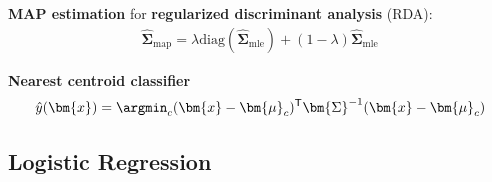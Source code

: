 \textbf{MAP estimation} for \textbf{regularized discriminant analysis} (RDA):
\begin{align}
    \hat{\bm{\Sigma}}_{\text{map}} = \lambda\mathrm{diag}(\hat{\bm{\Sigma}}_{\text{mle}}) + (1-\lambda)\hat{\bm{\Sigma}}_{\text{mle}}
\end{align}

\textbf{Nearest centroid classifier}
\begin{align}
    \hat{y}(\bm{x})=\argmin_{c}(\bm{x}-\bm{\mu}_c)^\mathsf{T}\bm{\Sigma}^{-1}(\bm{x}-\bm{\mu}_c)
\end{align}
\subsection{Logistic Regression}
